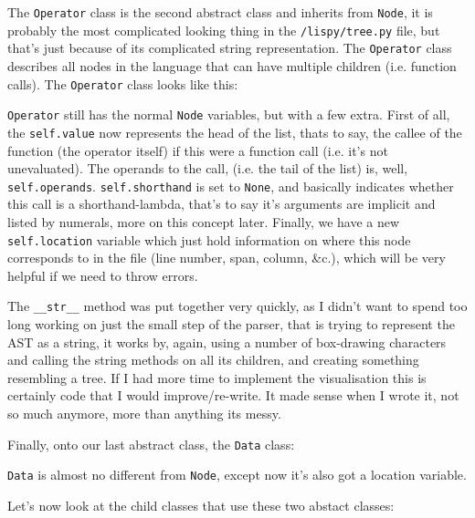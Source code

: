 \documentclass{article}
\newcommand{\code}[1]{\texttt{#1}}
\newcommand{\etc}{{\&}c.}
\begin{document}
      \clearpage

      The \code{Operator} class is the second abstract class and inherits from
      \code{Node}, it is probably the most complicated looking thing in the
      \code{/lispy/tree.py} file, but that's just because of its complicated
      string representation.  The \code{Operator} class describes all nodes in
      the language that can have multiple children (i.e. function calls). The
      \code{Operator} class looks like this:

      \graph{tree_Operator}{Inherits from \code{Node}.}

      \code{Operator} still has the normal \code{Node} variables, but with a few
      extra. First of all, the \code{self.value} now represents the head of the
      list, thats to say, the callee of the function (the operator itself)
      if this were a function call (i.e. it's not unevaluated). The operands
      to the call, (i.e. the tail of the list)  is, well, \code{self.operands}.
      \code{self.shorthand} is set to \code{None}, and basically indicates
      whether this call is a shorthand-lambda, that's to say it's arguments are
      implicit and listed by numerals, more on this concept later. Finally,
      we have a new \code{self.location} variable which just hold information
      on where this node corresponds to in the file (line number, span, column, \etc),
      which will be very helpful if we need to throw errors.

      The \code{\_\_str\_\_} method was put together very
      quickly, as I didn't want to spend too long working on just the small
      step of the parser, that is trying to represent the AST as a string, it
      works by, again, using a number of box-drawing characters and calling
      the string methods on all its children, and creating something resembling
      a tree.  If I had more time to implement the visualisation this is certainly
      code that I would improve/re-write.  It made sense when I wrote it, not
      so much anymore, more than anything its messy.

      Finally, onto our last abstract class, the \code{Data} class:


      \code{Data} is almost no different from \code{Node}, except now it's also
      got a location variable.

      Let's now look at the child classes that use these two abstact classes:
\end{document}
